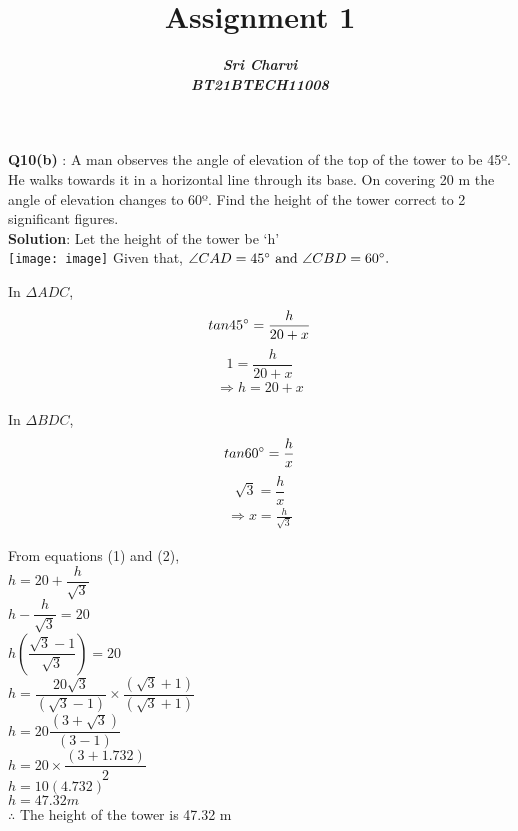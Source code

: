 \documentclass[journal,12pt,twocolumn]{IEEEtran}
\title{ Assignment 1}
\author{\textbf{\textit{Sri Charvi}}\\
\textbf{\textit{BT21BTECH11008}}}
\begin{document}
\maketitle
\textbf{Q10(b) }: A man observes the angle of elevation of the top of the tower to be 45º.
 He walks towards it in a horizontal line through its base. On covering 20 m the angle of 
elevation changes to 60º. Find the height of the tower correct to 2 significant figures.\\

\medskip
\textbf{Solution}: Let the height of the tower be `h'\\
\texttt{[image: image]}
Given that, $ \angle CAD=45\degree \text{ and } \angle CBD=60\degree.$ 


In $\Delta ADC$,
$$tan45\degree = \frac{h}{20+x}$$
$$1 = \frac{h}{20+x}$$
\begin{align}
\Longrightarrow h = 20+x 
\end{align} 

In $\Delta BDC$,
$$tan60\degree = \frac{h}{x}$$
$$\sqrt{3} = \frac{h}{x}$$
\begin{align}
\Longrightarrow x = \frac{h}{\sqrt{3}}
\end{align}

 From equations (1) and (2),\\
\vspace*{3mm}$h = 20+\dfrac{h}{\sqrt{3}}$\\
\vspace*{3mm}$h - \dfrac{h}{\sqrt{3}} = 20$\\
\vspace*{3mm}$h\left(\dfrac{\sqrt{3}-1}{\sqrt{3}}\right) = 20$\\
\vspace*{3mm}$h = \dfrac{20\sqrt{3}}{(\sqrt{3}-1)} \times \dfrac{(\sqrt{3}+1)}{(\sqrt{3}+1)}$\\
\vspace*{3mm}$h = 20\dfrac{(3+\sqrt{3})}{(3-1)}$\\
\vspace*{3mm}$h = 20 \times \dfrac{(3+1.732)}{2}$\\
\vspace*{3mm}$h = 10(4.732)$\\
\vspace*{3mm}$h = 47.32m$\\
$\therefore $ The height of the tower is 47.32 m
\end{document}
